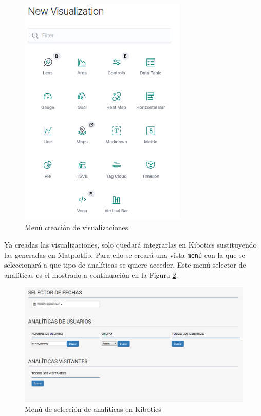 \documentclass[a4paper, 12pt]{book}
\begin{document}
		\begin{figure}[H]
			\centering
			\includegraphics[width=8cm, keepaspectratio]{img/visualization_selector.png}
			\caption{Menú creación de visualizaciones.}
			\label{fig:visualization_selector}
		\end{figure}
		

		Ya creadas las visualizaciones, solo quedará integrarlas en Kibotics sustituyendo las generadas en Matplotlib. Para ello se creará una vista \texttt{menú} con la que se seleccionará a que tipo de analíticas se quiere acceder. Este menú selector de analíticas es el mostrado a continuación en la Figura \ref{fig:kibotics_analytics_menu}.
	
		\begin{figure}[H]
			\centering
			\includegraphics[width=14cm, keepaspectratio]{img/kibotics_analytics_menu.png}
			\caption{Menú de selección de analíticas en Kibotics}
			\label{fig:kibotics_analytics_menu}
		\end{figure}
		
\end{document}
